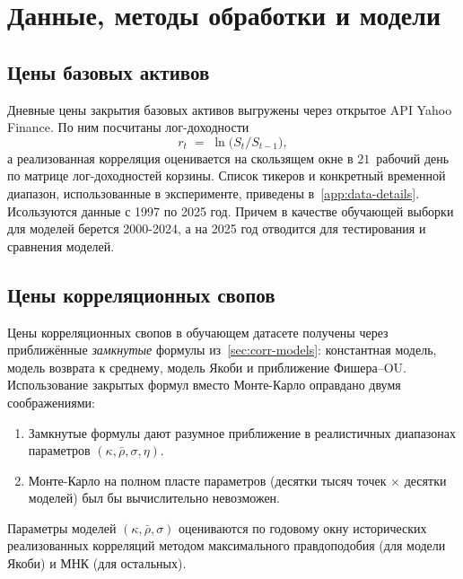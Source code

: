 \chapter{Данные, методы обработки и модели}
\label{ch:data}

\section{Цены базовых активов}
\label{sec:data-assets}

Дневные цены закрытия базовых активов выгружены через открытое
API Yahoo Finance. По ним посчитаны лог-доходности
\[
  r_t \;=\; \ln\bigl(S_t/S_{t-1}\bigr),
\]
а реализованная корреляция оценивается на скользящем окне в
$21$~рабочий день по матрице лог-доходностей корзины. Список тикеров и
конкретный временной диапазон, использованные в эксперименте, приведены
в~\cref{app:data-details}.
Исользуются данные с 1997 по 2025 год. Причем в качестве обучающей выборки для моделей 
берется 2000-2024, а на 2025 год отводится для тестирования и сравнения моделей.

\section{Цены корреляционных свопов}
\label{sec:data-corrswap}

Цены корреляционных свопов в обучающем датасете получены через
приближённые \emph{замкнутые} формулы из~\cref{sec:corr-models}:
константная модель, модель возврата к среднему, модель Якоби и
приближение Фишера--OU. Использование закрытых формул вместо Монте-Карло
оправдано двумя соображениями:

\begin{enumerate}
  \item Замкнутые формулы дают разумное приближение в реалистичных
        диапазонах параметров $(\kappa,\bar\rho,\sigma,\eta)$.
  \item Монте-Карло на полном пласте параметров (десятки тысяч точек
        $\times$ десятки моделей) был бы вычислительно невозможен.
\end{enumerate}

Параметры моделей $(\kappa,\bar\rho,\sigma)$ оцениваются по годовому
окну исторических реализованных корреляций методом максимального
правдоподобия (для модели Якоби) и МНК (для остальных).

